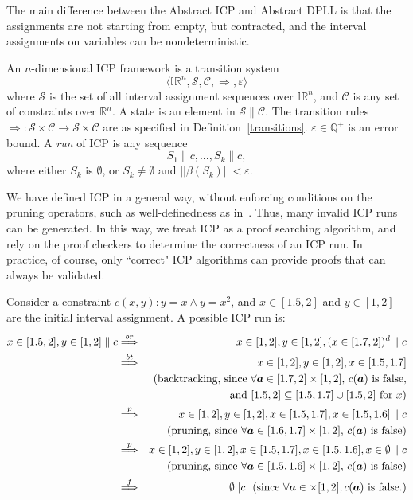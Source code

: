 \documentclass[envcountsect]{llncs}
\begin{document}
\begin{remark}
The main difference between the Abstract ICP and Abstract DPLL
is  that the assignments are not starting from empty, but contracted, and the
interval assignments on variables can be nondeterministic. 
\end{remark}
\begin{definition}
An $n$-dimensional ICP framework is a transition system
$$\langle \mathbb{IR}^n, \mathcal{S}, \mathcal{C}, \Longrightarrow,
\varepsilon\rangle$$
where $\mathcal{S}$ is the set of all interval assignment sequences over 
$\mathbb{IR}^n$, and $\mathcal{C}$ is any set of constraints over
$\mathbb{R}^n$. A state is an element in $\mathcal{S}\parallel \mathcal{C}$. The
transition rules $\Longrightarrow: \mathcal{S}\times \mathcal{C}\rightarrow
\mathcal{S} \times \mathcal{C}$ are as specified in
Definition~\ref{transitions}. $\varepsilon\in \mathbb{Q}^+$ is an
error bound. A {\em run} of ICP is any sequence
$$S_1\parallel c, ... , S_k\parallel c,$$
where either $S_k$ is $\emptyset$, or $S_k\neq \emptyset$ and
$||\beta(S_k)||<\varepsilon$.
\end{definition}
\begin{remark}
We have defined ICP in a general way, without enforcing conditions
on the pruning operators, such as well-definedness as in~\cite{}. Thus, many
invalid ICP runs can be generated. In this way, we treat ICP as a proof
searching algorithm, and rely on the proof checkers to determine the correctness
of an ICP run. In practice, of course, only ``correct" ICP algorithms can
provide proofs that can always be validated.
\end{remark}
\begin{example}
Consider a constraint $c(x,y) : y=x \wedge y = x^2$, and $x\in [1.5,2]$ and
$y\in [1,2]$ are the initial interval assignment. A possible ICP run is:
\begin{eqnarray*}
x\in [1.5,2], y\in [1,2]\parallel c &\stackrel{br}{\Longrightarrow}& x\in [1,2],
y\in [1,2], (x\in [1.7, 2])^d\parallel c\\
&\stackrel{bt}{\Longrightarrow}& x\in [1,2], y\in [1,2], x\in [1.5, 1.7]\\
& & \mbox{  (backtracking, since $\forall\vec a\in [1.7,2]\times [1,2]$, 
$c(\vec a)$ is false,}\\
& & \ \ \mbox{and $[1.5,2]\subseteq[1.5,1.7]\cup [1.5, 2]$ for
$x$)}\\
&\stackrel{p}{\Longrightarrow}& x\in [1,2], y\in [1,2], x\in [1.5, 1.7], x\in
[1.5, 1.6]\parallel c\\
& & \mbox{  (pruning, since $\forall \vec a\in[1.6,1.7]\times [1, 2]$, $c(\vec
a)$ is false)}\\
&\stackrel{p}{\Longrightarrow}& x\in [1,2], y\in [1,2], x\in [1.5, 1.7],
x\in [1.5, 1.6], x\in \emptyset\parallel c\\
& & \mbox{  (pruning, since $\forall \vec a\in[1.5,1.6]\times [1, 2]$, $c(\vec
a)$
is false)}\\
&\stackrel{f}{\Longrightarrow}& \emptyset||c\ \mbox{ (since
$\forall \vec a\in \empty\times [1, 2], c(\vec a)$ is false.)}
\end{eqnarray*}
\end{example}
\end{document}

